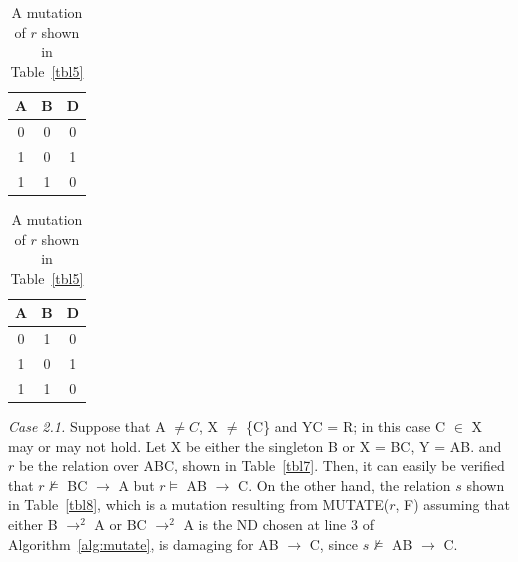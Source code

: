 \begin{table}[ht]
\begin{minipage}[b]{7cm}
\begin{center}
\begin{tabular}{|c|c|c|} \hline
A & B & D \\ \hline
0 & 0 & 0 \\
1 & 0 & 1 \\ 
1 & 1 & 0 \\ \hline
\end{tabular}
\end{center}
\caption{\label{tbl5} Example relation for Case 1.3.} 
\end{minipage}
\hfill
\begin{minipage}[b]{7cm}
\begin{center}
\begin{tabular}{|c|c|c|} \hline
A & B & D \\ \hline
0 & 1 & 0 \\
1 & 0 & 1 \\ 
1 & 1 & 0 \\ \hline
\end{tabular}
\end{center}
\caption{\label{tbl6} A mutation of $r$ shown in Table~\ref{tbl5}} 
\end{minipage}
\end{table}

{\em Case 2.1.}
Suppose that A $\not= C$, X $\not=$ \{C\} and YC = R; 
in this case C $\in$ X may or may not hold.
Let X be either the singleton B or X = BC, Y = AB.
and $r$ be the relation over ABC, shown in Table~\ref{tbl7}.
Then, it can easily be verified that 
$r \not\models$ BC $\to$ A 
but $r \models$ AB $\to$ C.
On the other hand, the relation $s$ shown in Table~\ref{tbl8},
which is a mutation resulting from MUTATE($r$, F) assuming that either
B $\to^2$ A or BC $\to^2$ A is the ND chosen at line 3 of 
Algorithm~\ref{alg:mutate},
is damaging for AB $\to$ C, since $s \not\models$ AB $\to$ C.

